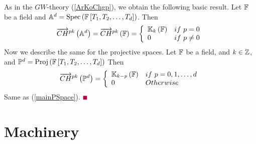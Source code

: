 \documentclass[12pt]{article}
\begin{document}
As in the $GW$-theory (\ref{ArKoChgp}), we obtain the following basic result.
\bC\label{eaKArKoChgp}{\rm 
Let ${\BF}$ be a field and ${\BA}^d=\spec{{\BF}\LRt{T_1, T_2, \ldots, T_d}}$. Then 
$$
\ora{CH}^{pk}\LRf{{\BA}^d} = \ora{CH}^{pk}\LRf{{\BF}}= \LBrace{{ll}
{\BK}_k\LRf{{\BF}} & if~p=0\\
0 & if ~p\neq 0\\
}%
$$
}
\eC
%
Now we describe the same for the projective spaces.
\bT\label{eaKmainPSpace}{\rm 
Let ${\BF}$ be a field, and $k\in {\BZ}$, and ${\BP}^d=\proj{{\BF}\LRt{T_1, T_2, \ldots, T_d}}$
%
Then 
$$
\ora{CH}^{pk}\LRf{{\BP}^d} =
\LBrace{{ll}
{\BK}_{k-p}\LRf{{\BF}} & if ~p=0, 1, \ldots, d\\
0 & Otherwise\\
} 
$$
}
\eT
\pf Same as (\ref{mainPSpace}). $\eop$ 




 \appendix
\section{Machinery}

\end{document}
